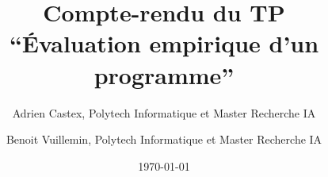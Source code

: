 \documentclass[a4paper,11pt]{article}
\let\urlorig\url
\renewcommand{\url}[1] {%
	\begin{otherlanguage}{english}\urlorig{#1}\end{otherlanguage}%
}
\begin{document}
\title{Compte-rendu du TP \\``Évaluation empirique d'un programme''}
\author{Adrien Castex, Polytech Informatique et Master Recherche IA \and Benoit Vuillemin, Polytech Informatique et Master Recherche IA}
\date{\today}
\maketitle

\tableofcontents
\newpage







\newpage

\end{document}
